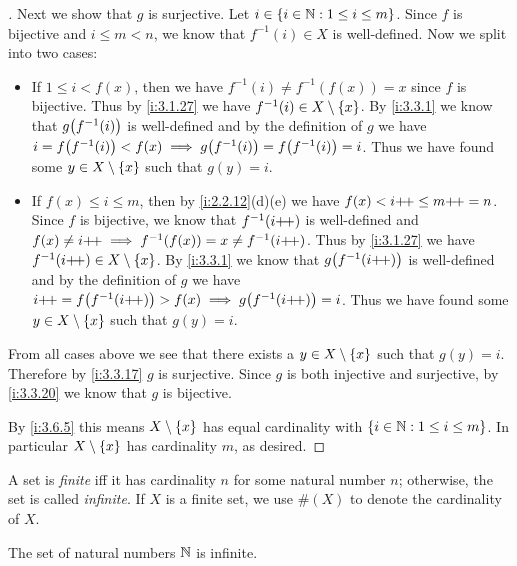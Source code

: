 \begin{proof}[]
  Next we show that \(g\) is surjective.
  Let \(i \in \left\lbrace i \in \mathbb{N} : 1 \leq i \leq m\right\rbrace\).
  Since \(f\) is bijective and \(i \leq m < n\), we know that \(f^{-1}(i) \in X\) is well-defined.
  Now we split into two cases:
  \begin{itemize}
    \item If \(1 \leq i < f(x)\), then we have \(f^{-1}(i) \neq f^{-1}(f(x)) = x\) since \(f\) is bijective.
          Thus by \cref{i:3.1.27} we have \(f^{-1}(i) \in X \setminus \left\lbrace x\right\rbrace\).
          By \cref{i:3.3.1} we know that \(g\pa{f^{-1}(i)}\) is well-defined and by the definition of \(g\) we have \(i = f\pa{f^{-1}(i)} < f(x) \implies g\pa{f^{-1}(i)} = f\pa{f^{-1}(i)} = i\).
          Thus we have found some \(y \in X \setminus \left\lbrace x\right\rbrace\) such that \(g(y) = i\).
    \item If \(f(x) \leq i \leq m\), then by \cref{i:2.2.12}(d)(e) we have \(f(x) < i{+}\!{+} \leq m{+}\!{+} = n\).
          Since \(f\) is bijective, we know that \(f^{-1}(i{+}\!{+})\) is well-defined and \(f(x) \neq i{+}\!{+} \implies f^{-1}(f(x)) = x \neq f^{-1}(i{+}\!{+})\).
          Thus by \cref{i:3.1.27} we have \(f^{-1}(i{+}\!{+}) \in X \setminus \left\lbrace x\right\rbrace\).
          By \cref{i:3.3.1} we know that \(g\pa{f^{-1}(i\pp)}\) is well-defined and by the definition of \(g\) we have \(i\pp = f\pa{f^{-1}(i\pp)} > f(x) \implies g\pa{f^{-1}(i\pp)} = i\).
          Thus we have found some \(y \in X \setminus \left\lbrace x\right\rbrace\) such that \(g(y) = i\).
  \end{itemize}
  From all cases above we see that there exists a \(y \in X \setminus \left\lbrace x\right\rbrace\) such that \(g(y) = i\).
  Therefore by \cref{i:3.3.17} \(g\) is surjective.
  Since \(g\) is both injective and surjective, by \cref{i:3.3.20} we know that \(g\) is bijective.

  By \cref{i:3.6.5} this means \(X \setminus \left\lbrace x\right\rbrace\) has equal cardinality with \(\left\lbrace i \in \mathbb{N} : 1 \leq i \leq m\right\rbrace\).
  In particular \(X \setminus \left\lbrace x\right\rbrace\) has cardinality \(m\), as desired.
\end{proof}

\begin{defn}\label{i:3.6.10}
  A set is \emph{finite} iff it has cardinality \(n\) for some natural number \(n\);
  otherwise, the set is called \emph{infinite}.
  If \(X\) is a finite set, we use \(\#(X)\) to denote the cardinality of \(X\).
\end{defn}

\setcounter{thm}{11}
\begin{thm}\label{i:3.6.12}
  The set of natural numbers \(\mathbb{N}\) is infinite.
\end{thm}

